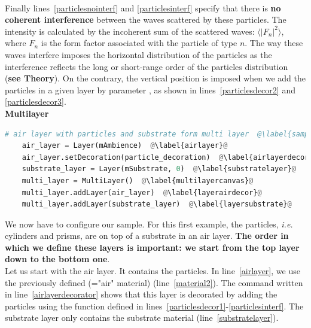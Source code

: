 \\


\noindent Finally lines~\ref{particlesnointerf} and
\ref{particlesinterf} specify that there is \textbf{no coherent interference} between
the waves scattered by these particles. The intensity is calculated by
the incoherent sum of the scattered waves: $\langle |F_n|^2\rangle$,
where $F_n$ is the form factor associated with the particle of type $n$.  The way these waves
interfere imposes the horizontal distribution of
the particles as
the interference reflects the long or short-range order of the
particles distribution (\textbf{see Theory}). On the contrary, the vertical position is
imposed when we add the particles in a given layer by parameter , as shown in lines~\ref{particlesdecor2} and \ref{particlesdecor3}. \\

\noindent \textbf{Multilayer}\\
  
\begin{lstlisting}[language=python, style=eclipseboxed,name=ex1,nolol]
    # air layer with particles and substrate form multi layer  @\label{sampleassembling}@
    air_layer = Layer(mAmbience)  @\label{airlayer}@
    air_layer.setDecoration(particle_decoration)  @\label{airlayerdecorator}@
    substrate_layer = Layer(mSubstrate, 0)  @\label{substratelayer}@
    multi_layer = MultiLayer()  @\label{multilayercanvas}@
    multi_layer.addLayer(air_layer)  @\label{layerairdecor}@
    multi_layer.addLayer(substrate_layer)  @\label{layersubstrate}@
\end{lstlisting}

\noindent We now have to configure our sample. For this first example,
the particles, \textit{i.e.} cylinders and prisms, are on top of a substrate in an
air layer. \textbf{The order in which we define these layers is important: we
start from the top layer down to the bottom one}.\\

\noindent Let us start with the air layer. It contains the particles. In
line~\ref{airlayer}, we use the previously defined 
(="air" material) (line~\ref{material2}). The command written in line~\ref{airlayerdecorator} shows that this layer is decorated by adding the
particles using the function  defined in
lines~\ref{particlesdecor1}-\ref{particlesinterf}. The substrate layer
only contains the substrate material (line~\ref{substratelayer}).\\%
 
